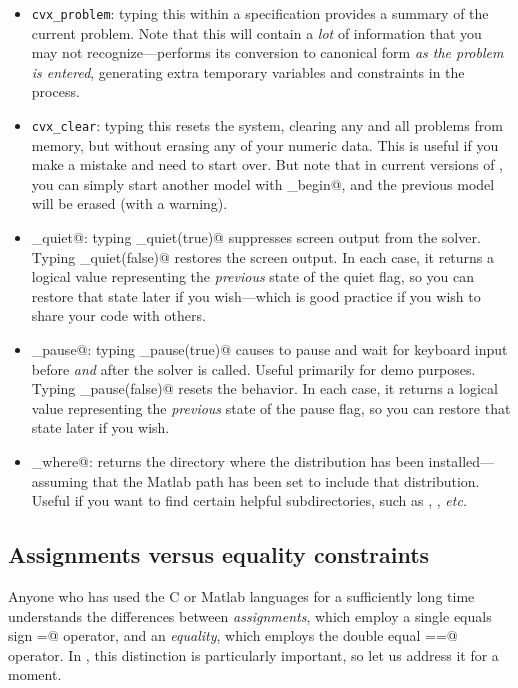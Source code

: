 \documentclass[12pt]{article}
\begin{document}
\begin{itemize}
\item \verb+cvx_problem+: typing this within a \cvx specification provides a summary
of the current problem. Note that this will contain a \emph{lot} of information
that you may not recognize---\cvx performs its conversion to canonical form
\emph{as the problem is entered}, generating extra temporary variables and
constraints in the process.
\item \verb+cvx_clear+: typing this resets the \cvx system, clearing any and all problems
from memory, but without erasing any of your numeric data.
This is useful if you make a mistake and need to start over. But note that in current
versions of \cvx, you can simply start another model with \verb@cvx_begin@, and
the previous model will be erased (with a warning).
\item \verb@cvx_quiet@: typing \verb@cvx_quiet(true)@ suppresses screen
output from the solver. Typing \verb@cvx_quiet(false)@ restores the screen
output. In each case, it returns a logical value representing the \emph{previous}
state of the quiet flag, so you can restore that state later if you wish---which
is good practice if you wish to share your code with others.
\item \verb@cvx_pause@: typing \verb@cvx_pause(true)@ causes \cvx to pause and
wait for keyboard input before \emph{and} after the solver is called. Useful
primarily for demo purposes. Typing \verb@cvx_pause(false)@ resets the behavior.
In each case, it returns a logical value representing the \emph{previous} state
of the pause flag, so you can restore that state later if you wish.
\item \verb@cvx_where@: returns the directory where the \cvx distribution
has been installed---assuming that the Matlab path has been set to include
that distribution. Useful if you want to find certain helpful subdirectories,
such as \verb@doc@, \verb@examples@, \emph{etc.}
\end{itemize}

\subsection{Assignments versus equality constraints}
\label{sec:eqass}

Anyone who has used the C or Matlab languages for a sufficiently long time
understands the differences between \emph{assignments}, which employ a single
equals sign \verb@=@ operator, and an \emph{equality}, which employs the
double equal \verb@==@ operator. In \cvx, this distinction is particularly
important, so let us address it for a moment.
\end{document}
